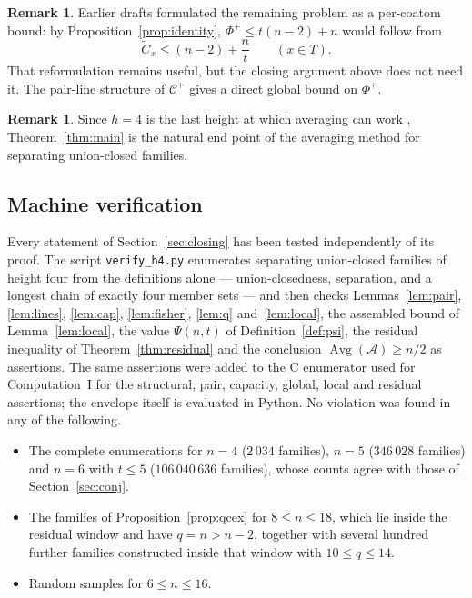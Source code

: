 \documentclass[11pt,a4paper]{amsart}
\theoremstyle{plain}
\theoremstyle{definition}
\newtheorem{remark}[theorem]{Remark}
\newcommand{\A}{\mathcal{A}}
\newcommand{\Cc}{\mathcal{C}}
\newcommand{\Avg}{\operatorname{Avg}}
\newcommand{\Cp}{\Cc^{+}}
\begin{document}
\begin{remark}
Earlier drafts formulated the remaining problem as a per-coatom bound: by
Proposition~\ref{prop:identity}, $\Phi^+\le t(n-2)+n$ would follow from
\[
  \widetilde C_x\le(n-2)+\frac nt
  \qquad(x\in T).
\]
That reformulation remains useful, but the closing argument above does not need
it. The pair-line structure of $\Cp$ gives a direct global bound on $\Phi^+$.
\end{remark}

\begin{remark}
Since $h=4$ is the last height at which averaging can work
\cite[Thm.~3.2]{Bouchard}, Theorem~\ref{thm:main} is the natural end point of
the averaging method for separating union-closed families.
\end{remark}

\subsection*{Machine verification}

Every statement of Section~\ref{sec:closing} has been tested independently of
its proof. The script \texttt{verify\_h4.py} enumerates separating union-closed
families of height four from the definitions alone --- union-closedness,
separation, and a longest chain of exactly four member sets --- and then checks
Lemmas~\ref{lem:pair}, \ref{lem:lines}, \ref{lem:cap}, \ref{lem:fisher},
\ref{lem:q} and~\ref{lem:local}, the assembled bound of
Lemma~\ref{lem:local}, the value $\Psi(n,t)$ of Definition~\ref{def:psi}, the
residual inequality of Theorem~\ref{thm:residual} and the conclusion
$\Avg(\A)\ge n/2$ as assertions. The same assertions were added to the
C enumerator used for Computation~I for the structural, pair, capacity, global,
local and residual assertions; the envelope itself is evaluated in Python.
No violation was found in any of the
following.

\begin{itemize}
\item The complete enumerations for $n=4$ ($2\,034$ families), $n=5$
      ($346\,028$ families) and $n=6$ with $t\le5$ ($106\,040\,636$ families),
      whose counts agree with those of Section~\ref{sec:conj}.
\item The families of Proposition~\ref{prop:qcex} for $8\le n\le18$, which lie
      inside the residual window and have $q=n>n-2$, together with several
      hundred further families constructed inside that window with
      $10\le q\le14$.
\item Random samples for $6\le n\le16$.
\end{itemize}
\end{document}
